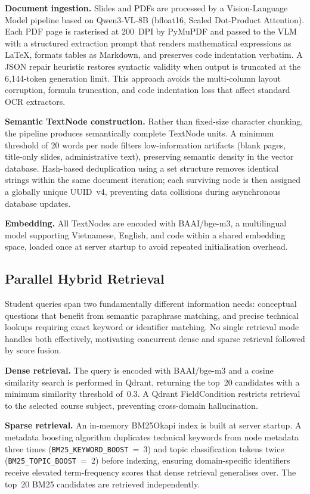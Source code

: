\documentclass[runningheads]{llncs}
\begin{document}
\noindent\textbf{Document ingestion.} Slides and PDFs are processed by a Vision-Language Model pipeline based on Qwen3-VL-8B (bfloat16, Scaled Dot-Product Attention). Each PDF page is rasterised at 200~DPI by PyMuPDF and passed to the VLM with a structured extraction prompt that renders mathematical expressions as LaTeX, formats tables as Markdown, and preserves code indentation verbatim. A JSON repair heuristic restores syntactic validity when output is truncated at the 6,144-token generation limit. This approach avoids the multi-column layout corruption, formula truncation, and code indentation loss that affect standard OCR extractors.

\noindent\textbf{Semantic TextNode construction.} Rather than fixed-size character chunking, the pipeline produces semantically complete TextNode units. A minimum threshold of 20 words per node filters low-information artifacts (blank pages, title-only slides, administrative text), preserving semantic density in the vector database. Hash-based deduplication using a set structure removes identical strings within the same document iteration; each surviving node is then assigned a globally unique UUID~v4, preventing data collisions during asynchronous database updates.

\noindent\textbf{Embedding.} All TextNodes are encoded with BAAI/bge-m3, a multilingual model supporting Vietnamese, English, and code within a shared embedding space, loaded once at server startup to avoid repeated initialisation overhead.

\subsection{Parallel Hybrid Retrieval}
\label{sec:retrieval}

Student queries span two fundamentally different information needs: conceptual questions that benefit from semantic paraphrase matching, and precise technical lookups requiring exact keyword or identifier matching. No single retrieval mode handles both effectively, motivating concurrent dense and sparse retrieval followed by score fusion.

\noindent\textbf{Dense retrieval.} The query is encoded with BAAI/bge-m3 and a cosine similarity search is performed in Qdrant, returning the top~20 candidates with a minimum similarity threshold of~0.3. A Qdrant FieldCondition restricts retrieval to the selected course subject, preventing cross-domain hallucination.

\noindent\textbf{Sparse retrieval.} An in-memory BM25Okapi index is built at server startup. A metadata boosting algorithm duplicates technical keywords from node metadata three times (\texttt{BM25\_KEYWORD\_BOOST}~=~3) and topic classification tokens twice (\texttt{BM25\_TOPIC\_BOOST}~=~2) before indexing, ensuring domain-specific identifiers receive elevated term-frequency scores that dense retrieval generalises over. The top~20 BM25 candidates are retrieved independently.
\end{document}
